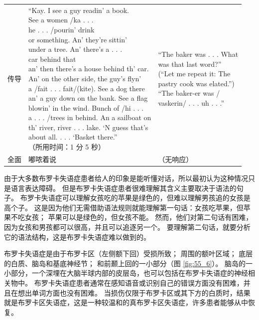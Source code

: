 \begin{table}[htbp]
\begin{tabular}{lll}
		传导 & \makecell[l]{“Kay. I see a guy readin’ a book. \\See a women /ka . . . \\he . . . /pourin’ drink \\ or something. An’ they’re sittin’ \\under a tree. An’ there’s a . . . \\car behind that \\ an’ then there’s a house behind th’ car. \\An’ on the other side, the guy’s flyn’ \\ a /fait . . . fait/(kite). See a dog there \\an’ a guy down on the bank. See a flag \\ blowin’ in the wind. Bunch of /hi . . . \\a . . . /trees in behind. An a sailboat on \\ th’ river, river . . . lake. ‘N guess that’s \\about all. . . . ‘Basket there.” \\（所用时间：1 分 5 秒）} & \makecell{“The baker was . . . What \\ was that last word?” \\ (“Let me repeat it: The \\ pastry cook was elated.”) \\ 	“The baker-er was / \\ vaskerin/ . . . uh . . .”} \\
		全面 & 嘟哝着说 & （无响应） \\
		\bottomrule
	\end{tabular}
\end{table}


由于大多数布罗卡失语症患者给人的印象是能听懂对话，所以最初认为这种情况只是语言表达障碍。
但是布罗卡失语症患者很难理解其含义主要取决于语法的句子。
布罗卡失语症可以理解女孩吃的苹果是绿色的，但难以理解男孩追的女孩是高个子。
这是因为他们无需借助语法规则就能理解第一句话：女孩吃苹果，但苹果不吃女孩；
苹果可以是绿色的，但女孩不能。
然而，他们对第二句话有困难，因为女孩和男孩都可以很高，并且可以追逐另一个。
要理解第二句话，就要分析它的语法结构，这是布罗卡失语症难以做到的。


布罗卡失语症是由于布罗卡区（左侧额下回）受损所致； 周围的额叶区域； 底层的白质、脑岛和基底神经节； 和前颞上回的一小部分（图 \ref{fig:55_6}）。
脑岛的一小部分，一个深埋在大脑半球内部的皮层岛，也可以包括在布罗卡失语症的神经相关物中。
布罗卡失语症患者通常在感知语音或识别自己的错误方面没有困难，并且在想出单词方面也没有困难。
当损伤仅限于布罗卡区或其下方的白质时，结果就是布罗卡区失语症，这是一种较温和的真布罗卡区失语症，许多患者能够从中恢复。


